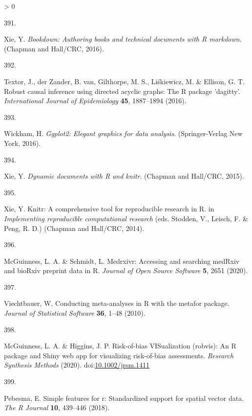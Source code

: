\documentclass[a4paper, twoside]{templates/ociamthesis}
\newlength{\cslhangindent}
\newlength{\csllabelwidth}
\newenvironment{CSLReferences}[3] %
 {%
  \setlength{\parindent}{0pt}
  \ifodd #1 \everypar{\setlength{\hangindent}{\cslhangindent}}\ignorespaces\fi
  \ifnum #2 > 0
  \setlength{\parskip}{#2\baselineskip}
  \fi
 }%
 {}
\newcommand{\CSLLeftMargin}[1]{\parbox[t]{\maxof{\widthof{#1}}{\csllabelwidth}}{#1}}
\newcommand{\CSLRightInline}[1]{\parbox[t]{\linewidth - \csllabelwidth}{#1}}
\begin{document}
\begin{CSLReferences}{0}{0}
\leavevmode\hypertarget{ref-bookdown2016}{}%
\CSLLeftMargin{391. }
\CSLRightInline{Xie, Y. \emph{Bookdown: Authoring books and technical documents with {R} markdown}. ({Chapman and Hall/CRC}, 2016).}

\leavevmode\hypertarget{ref-dagitty2016}{}%
\CSLLeftMargin{392. }
\CSLRightInline{Textor, J., der Zander, B. van, Gilthorpe, M. S., Liśkiewicz, M. \& Ellison, G. T. Robust causal inference using directed acyclic graphs: The {R} package 'dagitty'. \emph{International Journal of Epidemiology} \textbf{45}, 1887--1894 (2016).}

\leavevmode\hypertarget{ref-ggplot22016}{}%
\CSLLeftMargin{393. }
\CSLRightInline{Wickham, H. \emph{Ggplot2: Elegant graphics for data analysis}. ({Springer-Verlag New York}, 2016).}

\leavevmode\hypertarget{ref-knitr2015}{}%
\CSLLeftMargin{394. }
\CSLRightInline{Xie, Y. \emph{Dynamic documents with {R} and knitr}. ({Chapman and Hall/CRC}, 2015).}

\leavevmode\hypertarget{ref-knitr2014}{}%
\CSLLeftMargin{395. }
\CSLRightInline{Xie, Y. Knitr: A comprehensive tool for reproducible research in {R}. in \emph{Implementing reproducible computational research} (eds. Stodden, V., Leisch, F. \& Peng, R. D.) ({Chapman and Hall/CRC}, 2014).}

\leavevmode\hypertarget{ref-medrxivr2020}{}%
\CSLLeftMargin{396. }
\CSLRightInline{McGuinness, L. A. \& Schmidt, L. Medrxivr: Accessing and searching {medRxiv} and {bioRxiv} preprint data in {R}. \emph{Journal of Open Source Software} \textbf{5}, 2651 (2020).}

\leavevmode\hypertarget{ref-metafor2010}{}%
\CSLLeftMargin{397. }
\CSLRightInline{Viechtbauer, W. Conducting meta-analyses in {R} with the {metafor} package. \emph{Journal of Statistical Software} \textbf{36}, 1--48 (2010).}

\leavevmode\hypertarget{ref-robvis2020}{}%
\CSLLeftMargin{398. }
\CSLRightInline{McGuinness, L. A. \& Higgins, J. P. Risk-of-bias {VISualization} (robvis): An {R} package and {Shiny} web app for visualizing risk-of-bias assessments. \emph{Research Synthesis Methods} (2020). doi:\href{https://doi.org/10.1002/jrsm.1411}{10.1002/jrsm.1411}}

\leavevmode\hypertarget{ref-sf2018}{}%
\CSLLeftMargin{399. }
\CSLRightInline{Pebesma, E. Simple features for r: Standardized support for spatial vector data. \emph{The R Journal} \textbf{10}, 439--446 (2018).}

\end{CSLReferences}
\end{document}
